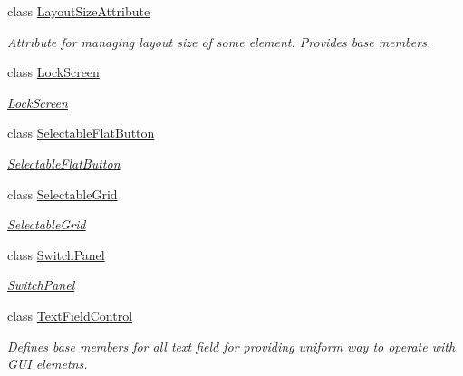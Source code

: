 \begin{DoxyCompactItemize}
class \mbox{\hyperlink{class_wpf_handler_1_1_u_i_1_1_controls_1_1_layout_size_attribute}{Layout\+Size\+Attribute}}
\begin{DoxyCompactList}\small\item\em Attribute for managing layout size of some element. Provides base members. \end{DoxyCompactList}\item 
class \mbox{\hyperlink{class_wpf_handler_1_1_u_i_1_1_controls_1_1_lock_screen}{Lock\+Screen}}
\begin{DoxyCompactList}\small\item\em \mbox{\hyperlink{class_wpf_handler_1_1_u_i_1_1_controls_1_1_lock_screen}{Lock\+Screen}} \end{DoxyCompactList}\item 
class \mbox{\hyperlink{class_wpf_handler_1_1_u_i_1_1_controls_1_1_selectable_flat_button}{Selectable\+Flat\+Button}}
\begin{DoxyCompactList}\small\item\em \mbox{\hyperlink{class_wpf_handler_1_1_u_i_1_1_controls_1_1_selectable_flat_button}{Selectable\+Flat\+Button}} \end{DoxyCompactList}\item 
class \mbox{\hyperlink{class_wpf_handler_1_1_u_i_1_1_controls_1_1_selectable_grid}{Selectable\+Grid}}
\begin{DoxyCompactList}\small\item\em \mbox{\hyperlink{class_wpf_handler_1_1_u_i_1_1_controls_1_1_selectable_grid}{Selectable\+Grid}} \end{DoxyCompactList}\item 
class \mbox{\hyperlink{class_wpf_handler_1_1_u_i_1_1_controls_1_1_switch_panel}{Switch\+Panel}}
\begin{DoxyCompactList}\small\item\em \mbox{\hyperlink{class_wpf_handler_1_1_u_i_1_1_controls_1_1_switch_panel}{Switch\+Panel}} \end{DoxyCompactList}\item 
class \mbox{\hyperlink{class_wpf_handler_1_1_u_i_1_1_controls_1_1_text_field_control}{Text\+Field\+Control}}
\begin{DoxyCompactList}\small\item\em Defines base members for all text field for providing uniform way to operate with G\+UI elemetns. \end{DoxyCompactList}\end{DoxyCompactItemize}
